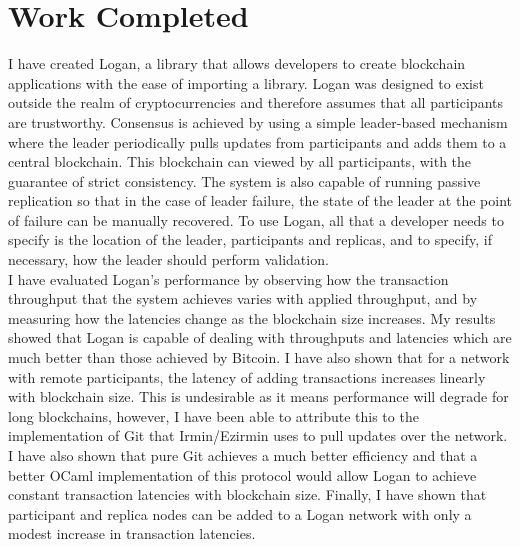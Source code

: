 \documentclass[12pt,a4paper,twoside,openright]{report}
\begin{document}
	\section{Work Completed}
	I have created Logan, a library that allows developers to create blockchain applications with the ease of importing a library.
	Logan was designed to exist outside the realm of cryptocurrencies and therefore assumes that all participants are trustworthy.
	Consensus is achieved by using a simple leader-based mechanism where the leader periodically pulls updates from participants and adds them to a central blockchain.
	This blockchain can viewed by all participants, with the guarantee of strict consistency.
	The system is also capable of running passive replication so that in the case of leader failure, the state of the leader at the point of failure can be manually recovered.
	To use Logan, all that a developer needs to specify is the location of the leader, participants and replicas, and to specify, if necessary, how the leader should perform validation.\\
	
	I have evaluated Logan's performance by observing how the transaction throughput that the system achieves varies with applied throughput, and by measuring how the latencies change as the blockchain size increases.
	My results showed that Logan is capable of dealing with throughputs and latencies which are much better than those achieved by Bitcoin.
	I have also shown that for a network with remote participants, the latency of adding transactions increases linearly with blockchain size. 
	This is undesirable as it means performance will degrade for long blockchains, however, I have been able to attribute this to the implementation of Git that Irmin/Ezirmin uses to pull updates over the network. 
	I have also shown that pure Git achieves a much better efficiency and that a better OCaml implementation of this protocol would allow Logan to achieve constant transaction latencies with blockchain size.
	Finally, I have shown that participant and replica nodes can be added to a Logan network with only a modest increase in transaction latencies.
\end{document}
